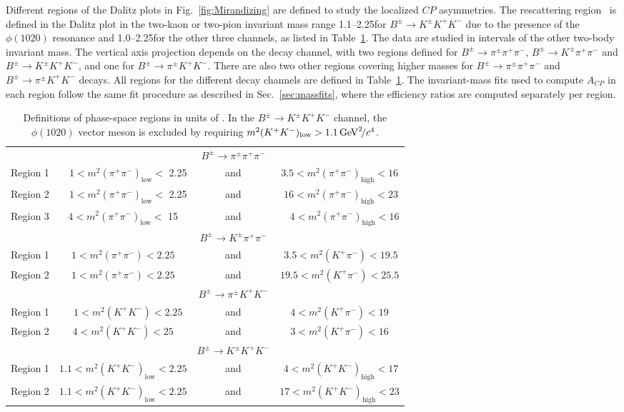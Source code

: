\documentclass[12pt,a4paper]{article}
\def\Ppi         {\ensuremath{\uppi}\xspace}
\def\PB      {\ensuremath{\mathrm{B}}\xspace}
\def\PK      {\ensuremath{\mathrm{K}}\xspace}
\def\Ppi         {\ensuremath{\pi}\xspace}
\def\PB      {\ensuremath{B}\xspace}
\def\PK      {\ensuremath{K}\xspace}
\def\pion   {{\ensuremath{\Ppi}}\xspace}
\def\pip    {{\ensuremath{\pion^+}}\xspace}
\def\pim    {{\ensuremath{\pion^-}}\xspace}
\def\pipm   {{\ensuremath{\pion^\pm}}\xspace}
\def\kaon    {{\ensuremath{\PK}}\xspace}
\def\Kp      {{\ensuremath{\kaon^+}}\xspace}
\def\Km      {{\ensuremath{\kaon^-}}\xspace}
\def\Kpm     {{\ensuremath{\kaon^\pm}}\xspace}
\def\B       {{\ensuremath{\PB}}\xspace}
\def\Bpm     {{\ensuremath{\B^\pm}}\xspace}
\def\to                 {\ensuremath{\rightarrow}\xspace}
\def\CP                {{\ensuremath{C\!P}}\xspace}
\def\pipipi {\ensuremath{{\Bpm \to \pipm \pip \pim}}\xspace}
\def\kpipi {\ensuremath{{\Bpm \to \Kpm \pip \pim}}\xspace}
\def\kkpi {\ensuremath{{\Bpm \to \pipm \Kp \Km }}\xspace}
\def\kkk {\ensuremath{{\Bpm \to \Kpm \Kp \Km}}\xspace}
\def\acp {\ensuremath{A_{\CP}}\xspace}
\begin{document}
Different regions of the Dalitz plots in Fig.~\ref{fig:Mirandizing} are defined to study the localized \CP asymmetries.
The rescattering region~\cite{Pelaez2018} is defined in the Dalitz plot in the two-kaon or two-pion invariant mass range 1.1--2.25\gevgevcccc for \kkk due to the presence of the $\phi(1020)$ resonance and 1.0--2.25\gevgevcccc for the other three channels, as listed in Table~\ref{table:table_regions}. The data are studied in intervals of the other two-body invariant mass. 
The vertical axis projection depends on the decay channel, with two regions defined for \pipipi, \kpipi and \kkk, and one for \kkpi. There are also two other regions covering higher masses for \pipipi and \kkpi decays. All regions for the different decay channels are defined in Table~\ref{table:table_regions}.
The invariant-mass fits used to compute \acp in each region follow the same fit procedure as described in Sec.~\ref{sec:massfits}, where the efficiency ratios are computed separately per region.

\begin{table}
\centering
\caption{Definitions of phase-space regions in units of \gevgevcccc. In the \kkk channel, the $\phi(1020)$ vector meson is excluded by requiring $m^2(K^+K^-)_{\textrm{low}} > 1.1\text{\,Ge\kern -0.1em V}^2\!/c^4$.}
\label{table:table_regions}
\begin{tabular}{c c c c}
\hline
& & \pipipi & \\
Region 1 & $\quad 1 < m^2(\pi^+ \pi^-)_{\textrm{low}} <$ 2.25 & and & $      3.5 < m^2(\pi^+ \pi^-)_{\textrm{high}} < 16$ \\
Region 2 & $\quad 1 < m^2(\pi^+ \pi^-)_{\textrm{low}} <$ 2.25 & and & $\;    16  < m^2(\pi^+ \pi^-)_{\textrm{high}} < 23$ \\
Region 3 & $4       < m^2(\pi^+ \pi^-)_{\textrm{low}} <$ 15   & and & $\quad 4   < m^2(\pi^+ \pi^-)_{\textrm{high}} < 16$ \\
\hline

& & \kpipi & \\
Region 1 & $1 < m^2(\pi^+ \pi^-) < 2.25$ & and & $\; 3.5 < m^2(K^+ \pi^-) < 19.5$ \\
Region 2 & $1 < m^2(\pi^+ \pi^-) < 2.25$ & and & $19.5 < m^2(K^+ \pi^-) < 25.5$ \\
\hline

& & \kkpi & \\
Region 1 & $\quad 1 < m^2(K^+K^-) < 2.25$ & and & $4 < m^2(K^+ \pi^-) < 19$ \\
Region 2 & $4 < m^2(K^+K^-) < 25$         & and & $3 < m^2(K^+ \pi^-) < 16$  \\
\hline

& & \kkk & \\
Region 1 & $1.1 < m^2(K^+ K^-)_{\textrm{low}} < 2.25$  & and & $\; 4 < m^2(K^+ K^-)_{\textrm{high}} < 17$ \\
Region 2 & $1.1 < m^2(K^+ K^-)_{\textrm{low}} < 2.25$  & and & $17 < m^2(K^+ K^-)_{\textrm{high}} < 23$ \\
\hline
\end{tabular}
\end{table}
\end{document}

